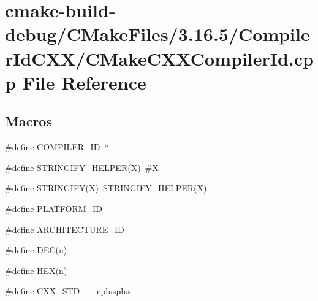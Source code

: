 \hypertarget{cmake-build-debug_2_c_make_files_23_816_85_2_compiler_id_c_x_x_2_c_make_c_x_x_compiler_id_8cpp}{}\section{cmake-\/build-\/debug/\+C\+Make\+Files/3.16.5/\+Compiler\+Id\+C\+X\+X/\+C\+Make\+C\+X\+X\+Compiler\+Id.cpp File Reference}
\label{cmake-build-debug_2_c_make_files_23_816_85_2_compiler_id_c_x_x_2_c_make_c_x_x_compiler_id_8cpp}
\subsection*{Macros}
\begin{DoxyCompactItemize}
\item 
\#define \hyperlink{cmake-build-debug_2_c_make_files_23_816_85_2_compiler_id_c_x_x_2_c_make_c_x_x_compiler_id_8cpp_a81dee0709ded976b2e0319239f72d174}{C\+O\+M\+P\+I\+L\+E\+R\+\_\+\+ID}~\char`\"{}\char`\"{}
\item 
\#define \hyperlink{cmake-build-debug_2_c_make_files_23_816_85_2_compiler_id_c_x_x_2_c_make_c_x_x_compiler_id_8cpp_a2ae9b72bb13abaabfcf2ee0ba7d3fa1d}{S\+T\+R\+I\+N\+G\+I\+F\+Y\+\_\+\+H\+E\+L\+P\+ER}(X)~\#X
\item 
\#define \hyperlink{cmake-build-debug_2_c_make_files_23_816_85_2_compiler_id_c_x_x_2_c_make_c_x_x_compiler_id_8cpp_a43e1cad902b6477bec893cb6430bd6c8}{S\+T\+R\+I\+N\+G\+I\+FY}(X)~\hyperlink{cmake-build-debug_2_c_make_files_23_816_85_2_compiler_id_c_x_x_2_c_make_c_x_x_compiler_id_8cpp_a2ae9b72bb13abaabfcf2ee0ba7d3fa1d}{S\+T\+R\+I\+N\+G\+I\+F\+Y\+\_\+\+H\+E\+L\+P\+ER}(X)
\item 
\#define \hyperlink{cmake-build-debug_2_c_make_files_23_816_85_2_compiler_id_c_x_x_2_c_make_c_x_x_compiler_id_8cpp_adbc5372f40838899018fadbc89bd588b}{P\+L\+A\+T\+F\+O\+R\+M\+\_\+\+ID}
\item 
\#define \hyperlink{cmake-build-debug_2_c_make_files_23_816_85_2_compiler_id_c_x_x_2_c_make_c_x_x_compiler_id_8cpp_aba35d0d200deaeb06aee95ca297acb28}{A\+R\+C\+H\+I\+T\+E\+C\+T\+U\+R\+E\+\_\+\+ID}
\item 
\#define \hyperlink{cmake-build-debug_2_c_make_files_23_816_85_2_compiler_id_c_x_x_2_c_make_c_x_x_compiler_id_8cpp_ad1280362da42492bbc11aa78cbf776ad}{D\+EC}(n)
\item 
\#define \hyperlink{cmake-build-debug_2_c_make_files_23_816_85_2_compiler_id_c_x_x_2_c_make_c_x_x_compiler_id_8cpp_a46d5d95daa1bef867bd0179594310ed5}{H\+EX}(n)
\item 
\#define \hyperlink{cmake-build-debug_2_c_make_files_23_816_85_2_compiler_id_c_x_x_2_c_make_c_x_x_compiler_id_8cpp_a34cc889e576a1ae6c84ae9e0a851ba21}{C\+X\+X\+\_\+\+S\+TD}~\+\_\+\+\_\+cplusplus
\end{DoxyCompactItemize}
